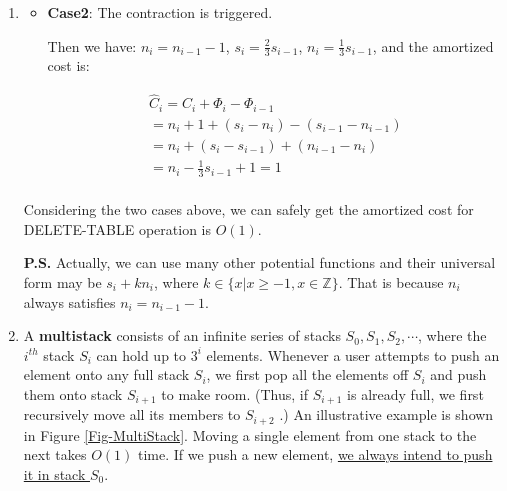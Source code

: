 \documentclass[12pt,a4paper]{article}
\makeatletter
\newtheorem*{solution}{Solution}
\theoremstyle{definition}
\renewenvironment{solution}[1][Solution] {\par\pushQED{\qed}\normalfont\topsep6\p@\@plus6\p@\relax\trivlist\item[\hskip\labelsep\bfseries#1\@addpunct{.}]\ignorespaces}{\popQED\endtrivlist\@endpefalse} \makeatother
\makeatother
\begin{document}
\begin{enumerate}
\begin{solution}
\begin{itemize}
			\item \textbf{Case2}: The contraction is triggered.
			
			Then we have: $n_i = n_{i-1} - 1$, $s_i = \frac{2}{3}s_{i-1}$, $n_i = \frac{1}{3}s_{i-1}$, and the amortized cost is:
			
			\begin{gather*}
				\hat{C}_i = C_i + \Phi_{i} - \Phi_{i-1} \\
				 = n_i + 1 + (s_i - n_i) - (s_{i - 1} - n_{i - 1})\\
				 = n_i + (s_i - s_{i - 1}) + (n_{i - 1} - n_{i}) \\
				 = n_i - \frac{1}{3}s_{i-1} + 1 = 1\\
			\end{gather*}


		\end{itemize}
		  
	Considering the two cases above, we can safely get the amortized cost for DELETE-TABLE operation is $O(1)$.

	\textbf{P.S.} Actually, we can use many other potential functions and their universal form may be $s_i + kn_i$, where $k \in \{x|x\geq -1, x\in \mathbb{Z}\}$.
	That is because $n_i$ always satisfies $n_i = n_{i - 1} - 1$.

		
	\end{solution}



	\item A \textbf{multistack} consists of an infinite series of stacks $S_0, S_1, S_2,\cdots$, where the $i^{th}$ stack $S_i$ can hold up to $3^i$ elements. Whenever a user attempts to push an element onto any full stack $S_i$, we first pop all the elements off $S_i$ and push them onto stack $S_{i+1}$ to make room. (Thus, if $S_{i+1}$ is already full, we first recursively move all its members to $S_{i+2}$ .) An illustrative example is shown in Figure \ref{Fig-MultiStack}. Moving a single element from one stack to the next takes $O(1)$ time. If we push a new element, \underline{we always intend to push it in stack $S_0$}.


\end{enumerate}
\end{document}

